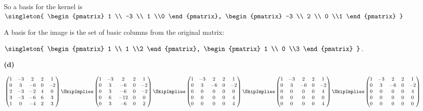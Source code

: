 \documentclass[oneside,12pt]{amsart}
\begin{document}
So a basis for the kernel is
$\singleton{
\begin{pmatrix}
1 \\ -3 \\ 1 \\0
\end{pmatrix},
\begin{pmatrix}
-3 \\ 2 \\ 0 \\1
\end{pmatrix}
}$

A basis for the image is the set of basic columns from the original matrix:

$\singleton{
\begin{pmatrix}
1 \\ 1 \\2
\end{pmatrix},
\begin{pmatrix}
1 \\ 0 \\3
\end{pmatrix}
}$.

\bigskip

\textbf{(d)}

\bigskip

$
\begin{pmatrix}
1 & -3 & 2 & 2 & 1   \\
0 &  3 & -6 & 0 & -2  \\
2 & -3 & -2 & 4 & 0  \\
3 & -3 & -6 & 6 & 3  \\
1 &  0 & -4 & 2 & 3
\end{pmatrix}
\SkipImplies
\begin{pmatrix}
1 & -3 & 2 & 2 & 1  \\
0 & 3 & -6 & 0 & -2 \\
0 & 3 & -6 & 0 & -2 \\
0 & 6 & -12 & 0 & 0 \\
0 & 3 & -6 & 0 & 2
\end{pmatrix}
\SkipImplies
\begin{pmatrix}
1 & -3 & 2 & 2 &  1   \\
0 & 3 & -6 & 0 & -2  \\
0 & 0 & 0 & 0 &   0    \\
0 & 0 & 0 & 0 &   4    \\
0 & 0 & 0 & 0 &   4
\end{pmatrix}
\SkipImplies
\begin{pmatrix}
1 & -3 & 2 & 2 & 1   \\
0 & 3 & -6 & 0 & -2  \\
0 & 0 & 0 & 0 & 4    \\
0 & 0 & 0 & 0 & 0    \\
0 & 0 & 0 & 0 & 4
\end{pmatrix}
\SkipImplies
\begin{pmatrix}
1 & -3 & 2 & 2 & 1   \\
0 & 3 & -6 & 0 & -2  \\
0 & 0 & 0 & 0 & 4    \\
0 & 0 & 0 & 0 & 0    \\
0 & 0 & 0 & 0 & 0
\end{pmatrix}
$
\end{document}
